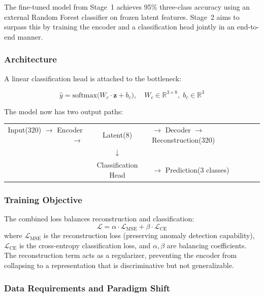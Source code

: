 \documentclass[12pt, a4paper]{article}
\begin{document}
The fine-tuned model from Stage~1 achieves 95\% three-class accuracy using an external Random Forest classifier on frozen latent features. Stage~2 aims to surpass this by training the encoder and a classification head jointly in an end-to-end manner.

\subsubsection{Architecture}

A linear classification head is attached to the bottleneck:

\begin{equation}
    \hat{y} = \text{softmax}\big(W_c \cdot \mathbf{z} + b_c\big), \quad W_c \in \mathbb{R}^{3 \times 8},\; b_c \in \mathbb{R}^3
\end{equation}

The model now has two output paths:

\begin{center}
\begin{tabular}{rcl}
Input(320) $\rightarrow$ Encoder $\rightarrow$ & Latent(8) & $\rightarrow$ Decoder $\rightarrow$ Reconstruction(320) \\
 & $\downarrow$ & \\
 & Classification Head & $\rightarrow$ Prediction(3 classes) \\
\end{tabular}
\end{center}

\subsubsection{Training Objective}

The combined loss balances reconstruction and classification:
\begin{equation}
    \mathcal{L} = \alpha \cdot \mathcal{L}_{\text{MSE}} + \beta \cdot \mathcal{L}_{\text{CE}}
\end{equation}
where $\mathcal{L}_{\text{MSE}}$ is the reconstruction loss (preserving anomaly detection capability), $\mathcal{L}_{\text{CE}}$ is the cross-entropy classification loss, and $\alpha, \beta$ are balancing coefficients. The reconstruction term acts as a regularizer, preventing the encoder from collapsing to a representation that is discriminative but not generalizable.

\subsubsection{Data Requirements and Paradigm Shift}
\end{document}
